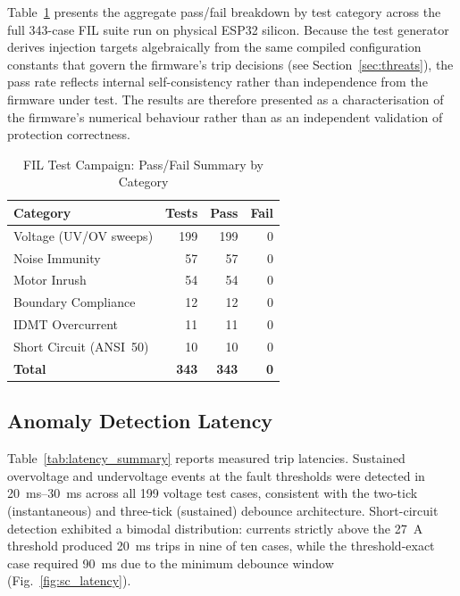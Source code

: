 \documentclass[conference]{IEEEtran}
\begin{document}
Table~\ref{tab:category_summary} presents the aggregate pass/fail
breakdown by test category across the full 343-case FIL suite run on
physical ESP32 silicon.  Because the test generator derives injection
targets algebraically from the same compiled configuration constants that
govern the firmware's trip decisions (see Section~\ref{sec:threats}),
the pass rate reflects internal self-consistency rather than
independence from the firmware under test.  The results are therefore
presented as a characterisation of the firmware's numerical behaviour
rather than as an independent validation of protection correctness.

\begin{table}[t]
  \caption{FIL Test Campaign: Pass/Fail Summary by Category}
  \label{tab:category_summary}
  \centering
  \begin{tabular}{lrrr}
    \toprule
    \textbf{Category} & \textbf{Tests} & \textbf{Pass} & \textbf{Fail} \\
    \midrule
    Voltage (UV/OV sweeps)   & 199 & 199 & 0 \\
    Noise Immunity           &  57 &  57 & 0 \\
    Motor Inrush             &  54 &  54 & 0 \\
    Boundary Compliance      &  12 &  12 & 0 \\
    IDMT Overcurrent         &  11 &  11 & 0 \\
    Short Circuit (ANSI~50)  &  10 &  10 & 0 \\
    \midrule
    \textbf{Total}  & \textbf{343} & \textbf{343} & \textbf{0} \\
    \bottomrule
  \end{tabular}
\end{table}

\subsection{Anomaly Detection Latency}

Table~\ref{tab:latency_summary} reports measured trip latencies.
Sustained overvoltage and undervoltage events at the fault thresholds
were detected in \SIrange{20}{30}{\milli\second} across all 199 voltage
test cases, consistent with the two-tick (instantaneous) and three-tick
(sustained) debounce architecture.  Short-circuit detection exhibited
a bimodal distribution: currents strictly above the \SI{27}{\ampere}
threshold produced \SI{20}{\milli\second} trips in nine of ten cases,
while the threshold-exact case required \SI{90}{\milli\second} due to
the minimum debounce window (Fig.~\ref{fig:sc_latency}).
\end{document}
